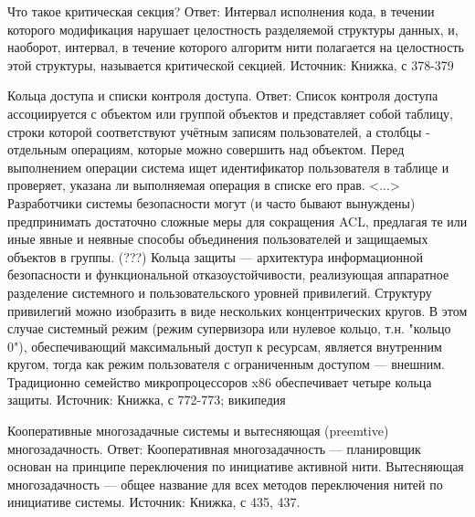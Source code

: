\documentclass[russian,twocolumn]{article}
\begin{document}
Что такое критическая секция?
Ответ: 
Интервал исполнения кода, в течении которого модификация нарушает целостность разделяемой структуры данных, и, наоборот, интервал, в течение которого алгоритм нити полагается на целостность этой структуры, называется критической секцией. 
Источник: 
Книжка, с 378-379 

Кольца доступа и списки контроля доступа.
Ответ: 
Список контроля доступа ассоциируется с объектом или группой объектов и представляет собой таблицу, строки которой соответствуют учётным записям пользователей, а столбцы - отдельным операциям, которые можно совершить над объектом. Перед выполнением операции система ищет идентификатор пользователя в таблице и проверяет, указана ли выполняемая операция в списке его прав. <...> Разработчики системы безопасности могут (и часто бывают вынуждены) предпринимать достаточно сложные меры для сокращения ACL, предлагая те или иные явные и неявные способы объединения пользователей и защищаемых объектов в группы. 
(???) Кольца защиты — архитектура информационной безопасности и функциональной отказоустойчивости, реализующая аппаратное разделение системного и пользовательского уровней привилегий. Структуру привилегий можно изобразить в виде нескольких концентрических кругов. В этом случае системный режим (режим супервизора или нулевое кольцо, т.н. "кольцо 0"), обеспечивающий максимальный доступ к ресурсам, является внутренним кругом, тогда как режим пользователя с ограниченным доступом — внешним. Традиционно семейство микропроцессоров x86 обеспечивает четыре кольца защиты. 
Источник: 
Книжка, с 772-773; википедия 

Кооперативные многозадачные системы и вытесняющая (preemtive) многозадачность.
Ответ: 
Кооперативная многозадачность — планировщик основан на принципе переключения по инициативе активной нити. 
Вытесняющая многозадачность — общее название для всех методов переключения нитей по инициативе системы. 
Источник: 
Книжка, с 435, 437. 
\end{document}
